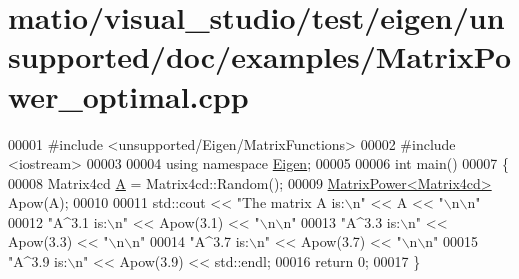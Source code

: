 \hypertarget{matio_2visual__studio_2test_2eigen_2unsupported_2doc_2examples_2_matrix_power__optimal_8cpp_source}{}\section{matio/visual\+\_\+studio/test/eigen/unsupported/doc/examples/\+Matrix\+Power\+\_\+optimal.cpp}
\label{matio_2visual__studio_2test_2eigen_2unsupported_2doc_2examples_2_matrix_power__optimal_8cpp_source}

\begin{DoxyCode}
00001 \textcolor{preprocessor}{#include <unsupported/Eigen/MatrixFunctions>}
00002 \textcolor{preprocessor}{#include <iostream>}
00003 
00004 \textcolor{keyword}{using namespace }\hyperlink{namespace_eigen}{Eigen};
00005 
00006 \textcolor{keywordtype}{int} main()
00007 \{
00008   Matrix4cd \hyperlink{group___core___module_class_eigen_1_1_matrix}{A} = Matrix4cd::Random();
00009   \hyperlink{class_eigen_1_1_matrix_power}{MatrixPower<Matrix4cd>} Apow(A);
00010 
00011   std::cout << \textcolor{stringliteral}{"The matrix A is:\(\backslash\)n"} << A << \textcolor{stringliteral}{"\(\backslash\)n\(\backslash\)n"}
00012            \textcolor{stringliteral}{"A^3.1 is:\(\backslash\)n"} << Apow(3.1) << \textcolor{stringliteral}{"\(\backslash\)n\(\backslash\)n"}
00013            \textcolor{stringliteral}{"A^3.3 is:\(\backslash\)n"} << Apow(3.3) << \textcolor{stringliteral}{"\(\backslash\)n\(\backslash\)n"}
00014            \textcolor{stringliteral}{"A^3.7 is:\(\backslash\)n"} << Apow(3.7) << \textcolor{stringliteral}{"\(\backslash\)n\(\backslash\)n"}
00015            \textcolor{stringliteral}{"A^3.9 is:\(\backslash\)n"} << Apow(3.9) << std::endl;
00016   \textcolor{keywordflow}{return} 0;
00017 \}
\end{DoxyCode}
